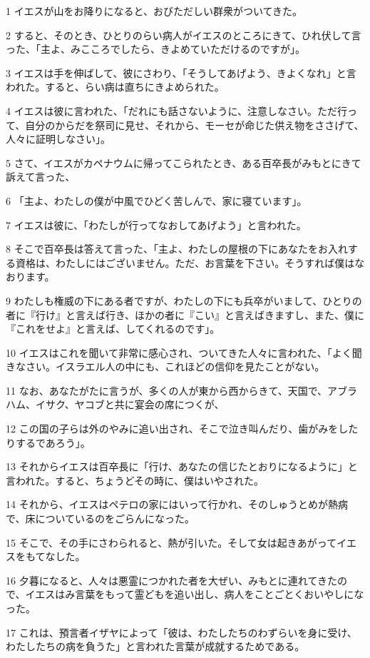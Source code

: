 \par 1 イエスが山をお降りになると、おびただしい群衆がついてきた。
\par 2 すると、そのとき、ひとりのらい病人がイエスのところにきて、ひれ伏して言った、「主よ、みこころでしたら、きよめていただけるのですが」。
\par 3 イエスは手を伸ばして、彼にさわり、「そうしてあげよう、きよくなれ」と言われた。すると、らい病は直ちにきよめられた。
\par 4 イエスは彼に言われた、「だれにも話さないように、注意しなさい。ただ行って、自分のからだを祭司に見せ、それから、モーセが命じた供え物をささげて、人々に証明しなさい」。
\par 5 さて、イエスがカペナウムに帰ってこられたとき、ある百卒長がみもとにきて訴えて言った、
\par 6 「主よ、わたしの僕が中風でひどく苦しんで、家に寝ています」。
\par 7 イエスは彼に、「わたしが行ってなおしてあげよう」と言われた。
\par 8 そこで百卒長は答えて言った、「主よ、わたしの屋根の下にあなたをお入れする資格は、わたしにはございません。ただ、お言葉を下さい。そうすれば僕はなおります。
\par 9 わたしも権威の下にある者ですが、わたしの下にも兵卒がいまして、ひとりの者に『行け』と言えば行き、ほかの者に『こい』と言えばきますし、また、僕に『これをせよ』と言えば、してくれるのです」。
\par 10 イエスはこれを聞いて非常に感心され、ついてきた人々に言われた、「よく聞きなさい。イスラエル人の中にも、これほどの信仰を見たことがない。
\par 11 なお、あなたがたに言うが、多くの人が東から西からきて、天国で、アブラハム、イサク、ヤコブと共に宴会の席につくが、
\par 12 この国の子らは外のやみに追い出され、そこで泣き叫んだり、歯がみをしたりするであろう」。
\par 13 それからイエスは百卒長に「行け、あなたの信じたとおりになるように」と言われた。すると、ちょうどその時に、僕はいやされた。
\par 14 それから、イエスはペテロの家にはいって行かれ、そのしゅうとめが熱病で、床についているのをごらんになった。
\par 15 そこで、その手にさわられると、熱が引いた。そして女は起きあがってイエスをもてなした。
\par 16 夕暮になると、人々は悪霊につかれた者を大ぜい、みもとに連れてきたので、イエスはみ言葉をもって霊どもを追い出し、病人をことごとくおいやしになった。
\par 17 これは、預言者イザヤによって「彼は、わたしたちのわずらいを身に受け、わたしたちの病を負うた」と言われた言葉が成就するためである。
